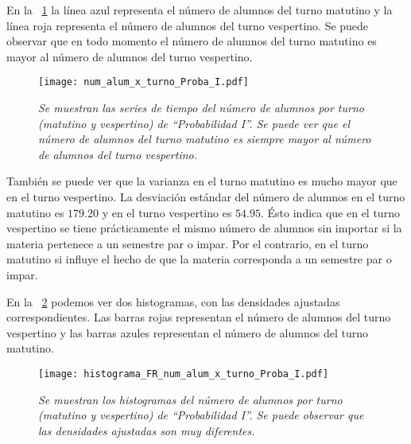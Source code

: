 En la \figurename{~\ref{num_alum_x_turno_Proba_I}} la línea azul representa el número de alumnos del turno matutino y la línea roja representa el número de alumnos del turno vespertino. Se puede observar que en todo momento el número de alumnos del turno matutino es mayor al número de alumnos del turno vespertino.

\begin{figure}[H]
\centering
\texttt{[image: num\_alum\_x\_turno\_Proba\_I.pdf]} %
\caption[\textit{Número de alumnos por turno: Probabilidad I}]{\textit{Se muestran las series de tiempo del número de alumnos por turno (matutino y vespertino) de ``Probabilidad I''. Se puede ver que el número de alumnos del turno matutino es siempre mayor al número de alumnos del turno vespertino.}}\label{num_alum_x_turno_Proba_I}
\end{figure}

También se puede ver que la varianza en el turno matutino es mucho mayor que en el turno vespertino. La desviación estándar del número de alumnos en el turno matutino es $179.20$ y en el turno vespertino es $54.95$. Ésto indica que en el turno vespertino se tiene prácticamente el mismo número de alumnos sin importar si la materia pertenece a un semestre par o impar. Por el contrario, en el turno matutino si influye el hecho de que la materia corresponda a un semestre par o impar.



En la \figurename{~\ref{HistAlumTurnoProbaI}} podemos ver dos histogramas, con las densidades ajustadas correspondientes. Las barras rojas representan el número de alumnos del turno vespertino y las barras azules representan el número de alumnos del turno matutino.

\begin{figure}[H]
\centering
\texttt{[image: histograma\_FR\_num\_alum\_x\_turno\_Proba\_I.pdf]} %
\caption[\textit{Histogramas del número de alumnos por turno: Probabilidad I}]{\textit{Se muestran los histogramas del número de alumnos por turno (matutino y vespertino) de ``Probabilidad I''. Se puede observar que las densidades ajustadas son muy diferentes.}}\label{HistAlumTurnoProbaI}
\end{figure}

